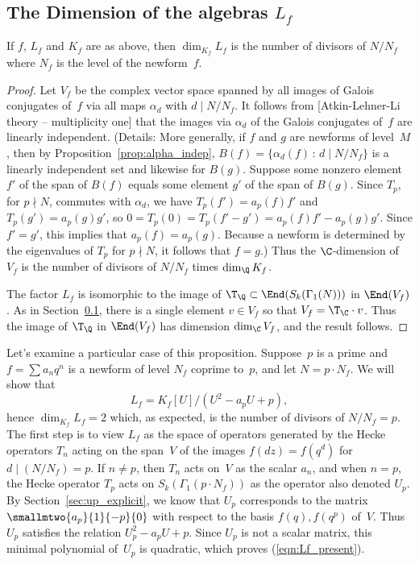 \documentclass{report}
\begin{document}
\subsection{The Dimension of the algebras $L_f$}
\begin{proposition}\label{prop:dim_lf_kf}
If $f$, $L_f$ and $K_f$ are as above, then $\dim_{K_f} L_f$ is the
number of divisors of $N/N_f$ where $N_f$ is the level of the
newform~$f$.
\end{proposition}
\begin{proof}
Let $V_f$ be the complex vector space spanned by all images of
Galois conjugates of~$f$ via all maps $\alpha_d$ with $d\mid
N/N_f$. It follows from [Atkin-Lehner-Li theory -- multiplicity
one] that the images via $\alpha_d$ of the Galois
conjugates of~$f$ are linearly independent. (Details: More
generally, if $f$ and $g$ are newforms of level~$M$, then by
Proposition~\ref{prop:alpha_indep}, $B(f) = \{\alpha_{d}(f) \,:\,
d \mid N/N_f\}$ is a linearly independent set and likewise for
$B(g)$.  Suppose some nonzero element $f'$ of the span of $B(f)$
equals some element $g'$ of the span of $B(g)$.  Since $T_p$, for
$p\nmid N$, commutes with $\alpha_d$, we have $T_p(f')=a_p(f) f'$
and $T_p(g')=a_p(g)g'$, so $0=T_p(0)=T_p(f'-g') =
a_p(f)f'-a_p(g)g'$. Since $f'=g'$, this implies that
$a_p(f)=a_p(g)$.  Because a newform is determined by the
eigenvalues of $T_p$ for $p\nmid N$, it follows that $f=g$.) Thus
the $\C$-dimension of $V_f$ is the number of divisors of $N/N_f$
times $\dim_{\Q} K_f$.

The factor $L_f$ is isomorphic to the image of $\T_\Q\subset
\End(S_k(\Gamma_1(N)))$ in $\End(V_f)$.  As in Section~\ref{},
there is a single element $v\in V_f$ so that $V_f = \T_\C \cdot
v$. Thus the image of $\T_\Q$ in $\End(V_f)$ has dimension
$\dim_\C V_f$, and the result follows.
\end{proof}

Let's examine a particular case of this proposition. Suppose~$p$ is a
prime and~$f=\sum a_n q^n$ is a newform of level $N_f$ coprime to~$p$,
and let $N=p\cdot N_f$.  We will show that
\begin{equation}\label{eqn:Lf_present}
  L_f=K_f[U]/(U^2-a_p{}U+p),
\end{equation}
hence $\dim_{K_f} L_f=2$ which, as expected, is the number of divisors
of $N/N_f=p$. The first step is to view $L_f$ as the space of
operators generated by the Hecke operators $T_n$ acting on the span~$V$ of
the images $f(dz)=f(q^d)$ for $d\mid (N/N_f)=p$.  If $n\neq{}p$, then $T_n$
acts on~$V$ as the scalar $a_n$, and when $n=p$, the Hecke
operator $T_p$ acts on $S_k(\Gamma_1(p\cdot N_f))$ as the operator
also denoted $U_p$.  By Section~\ref{sec:up_explicit}, we know that
$U_p$ corresponds to the matrix $\smallmtwo{a_p}{1}{-p}{0}$ with
respect to the basis $f(q), f(q^p)$ of~$V$. Thus $U_p$ satisfies the relation
$U_p^2-a_pU+p$.  Since $U_p$ is not a scalar matrix, this minimal polynomial
of~$U_p$ is quadratic, which proves (\ref{eqn:Lf_present}).
\end{document}

